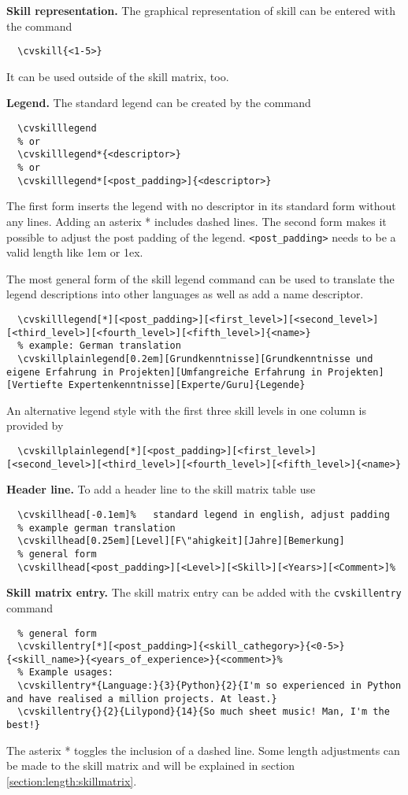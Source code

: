\documentclass[a4paper,11pt]{article}
\newcommand{\code}[1]{\lstinline!#1!}
\begin{document}
{\bfseries Skill representation. } The graphical representation of skill can be entered with the command 
\begin{lstlisting}
  \cvskill{<1-5>}
\end{lstlisting}
It can be used outside of the skill matrix, too. \medskip


{\bfseries Legend. } The standard legend can be created by the command
\begin{lstlisting}
  \cvskilllegend
  % or
  \cvskilllegend*{<descriptor>}
  % or
  \cvskilllegend*[<post_padding>]{<descriptor>}
\end{lstlisting}
The first form inserts the legend with no descriptor in its standard form without any lines. 
Adding an asterix * includes dashed lines. 
The second form makes it possible to adjust the post padding of the legend. \code{<post_padding>} needs to be a valid length like 1em or 1ex.

The most general form of the skill legend command can be used to translate the legend descriptions into other languages as well as add a name descriptor.  

\begin{lstlisting}
  \cvskilllegend[*][<post_padding>][<first_level>][<second_level>][<third_level>][<fourth_level>][<fifth_level>]{<name>}
  % example: German translation
  \cvskillplainlegend[0.2em][Grundkenntnisse][Grundkenntnisse und eigene Erfahrung in Projekten][Umfangreiche Erfahrung in Projekten][Vertiefte Expertenkenntnisse][Experte/Guru]{Legende}
\end{lstlisting}

An alternative legend style with the first three skill levels in one column is provided by 
\begin{lstlisting}
  \cvskillplainlegend[*][<post_padding>][<first_level>][<second_level>][<third_level>][<fourth_level>][<fifth_level>]{<name>}
\end{lstlisting} \medskip

{\bfseries Header line. } To add a header line to the skill matrix table use 
\begin{lstlisting}
  \cvskillhead[-0.1em]%   standard legend in english, adjust padding
  % example german translation
  \cvskillhead[0.25em][Level][F\"ahigkeit][Jahre][Bemerkung]
  % general form 
  \cvskillhead[<post_padding>][<Level>][<Skill>][<Years>][<Comment>]%
\end{lstlisting}

{\bfseries Skill matrix entry. } The skill matrix entry can be added with the \code{cvskillentry} command
\begin{lstlisting}
  % general form
  \cvskillentry[*][<post_padding>]{<skill_cathegory>}{<0-5>}{<skill_name>}{<years_of_experience>}{<comment>}% 
  % Example usages:
  \cvskillentry*{Language:}{3}{Python}{2}{I'm so experienced in Python and have realised a million projects. At least.}
  \cvskillentry{}{2}{Lilypond}{14}{So much sheet music! Man, I'm the best!}
\end{lstlisting}
The asterix * toggles the inclusion of a dashed line. 
Some length adjustments can be made to the skill matrix and will be explained in section \ref{section:length:skillmatrix}.
\end{document}
